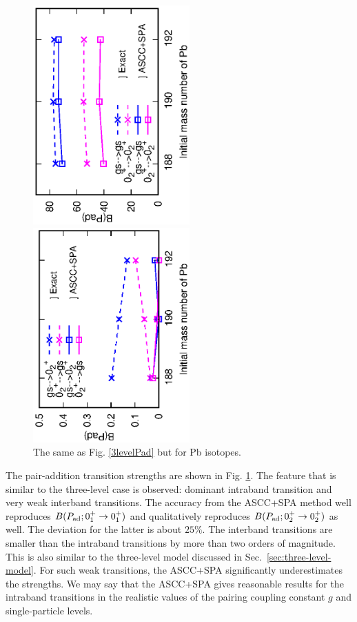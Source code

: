 \documentclass[%
superscriptaddress,
showpacs,
nofootinbib,
amsmath,amssymb,
aps,
prc,
twocolumn,
floatfix ]%
{revtex4-1}
\begin{document}
\begin{figure}[htbp]
 \begin{center}
  \includegraphics[width=60mm,angle=-90]{Pbintra_trans.eps}
 \end{center}
 \begin{center}
  \includegraphics[width=60mm,angle=-90]{Pbinter_trans.eps}
 \end{center}
	\caption{The same as Fig. \ref{3levelPad} but for Pb isotopes.
}
 \label{PbPad}
\end{figure}
The pair-addition transition strengths are shown in Fig. \ref{PbPad}.
The feature that is similar to the three-level case is observed:
dominant intraband transition and very weak interband transitions.
The accuracy from the ASCC+SPA method well reproduces
$B(P_{\rm ad};0_1^+\rightarrow 0_1^+)$
and qualitatively reproduces
$B(P_{\rm ad};0_2^+\rightarrow 0_2^+)$ as well.
The deviation for the latter is about $25\%$.
The interband transitions are smaller than the intraband transitions
by more than two orders of magnitude.
This is also similar to the three-level model discussed
in Sec.~\ref{sec:three-level-model}.
For such weak transitions, the ASCC+SPA significantly
underestimates the strengths.
We may say that the ASCC+SPA gives reasonable results for the intraband
transitions in the realistic values of the pairing coupling constant $g$ and
single-particle levels.
\end{document}
